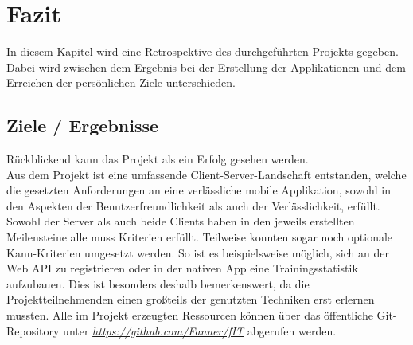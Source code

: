 \chapter{Fazit}
\label{fazit}
In diesem Kapitel wird eine Retrospektive des durchgeführten Projekts gegeben. Dabei wird zwischen dem Ergebnis bei der Erstellung der Applikationen und dem Erreichen der persönlichen Ziele unterschieden.
\section{Ziele / Ergebnisse}
\label{sec:ziele-ergebnisse}
Rückblickend kann das Projekt als ein Erfolg gesehen werden. \\
Aus dem Projekt ist eine umfassende Client-Server-Landschaft entstanden, welche die gesetzten Anforderungen an eine verlässliche mobile Applikation, sowohl in den Aspekten der Benutzerfreundlichkeit als auch der Verlässlichkeit, erfüllt. Sowohl der Server als auch beide Clients haben in den jeweils erstellten Meilensteine alle muss Kriterien erfüllt. Teilweise konnten sogar noch optionale Kann-Kriterien umgesetzt werden. So ist es beispielsweise möglich, sich an der Web \ac{API} zu registrieren oder in der nativen \gls{App} eine Trainingsstatistik aufzubauen. 
Dies ist besonders deshalb bemerkenswert, da die Projektteilnehmenden einen großteils der genutzten Techniken erst erlernen mussten. 
Alle im Projekt erzeugten Ressourcen können über das öffentliche Git-Repository unter \textit{\href{https://github.com/Fanuer/fIT}{https://github.com/Fanuer/fIT}} abgerufen werden. 

